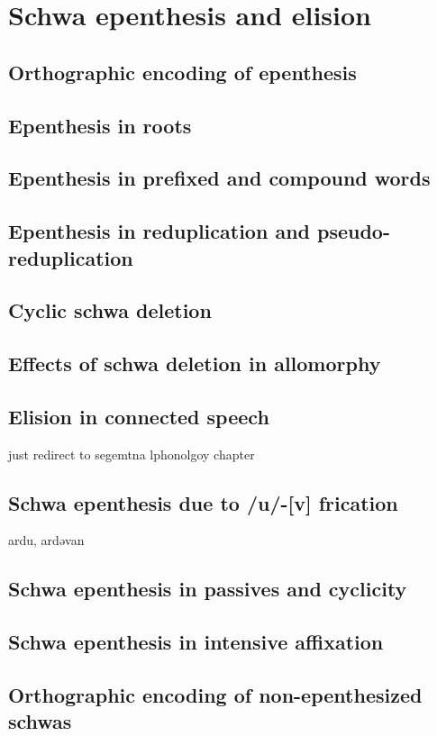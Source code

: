 
\chapter{Schwa epenthesis and elision}
\section{Orthographic encoding of epenthesis}
\section{Epenthesis in roots}
\section{Epenthesis in prefixed and compound words}
\section{Epenthesis in reduplication and pseudo-reduplication}
\section{Cyclic schwa deletion}
\section{Effects of schwa deletion in allomorphy}
\section{Elision in connected speech}
just redirect to segemtna lphonolgoy chapter

\section{Schwa epenthesis due to /u/-[v] frication}
ardu, ardəvan
\section{Schwa epenthesis in passives and cyclicity}
\section{Schwa epenthesis in intensive affixation}
\section{Orthographic encoding of non-epenthesized schwas}

